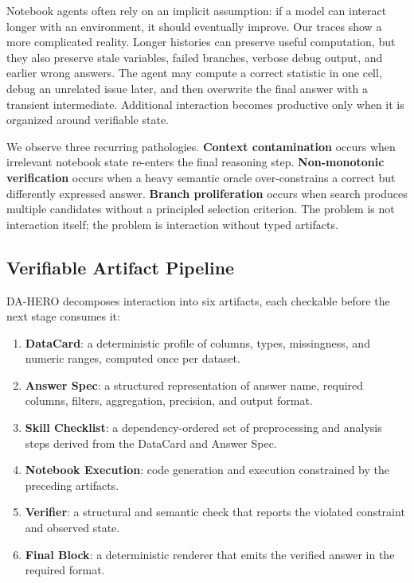 \documentclass[letterpaper]{article} %
\begin{document}
Notebook agents often rely on an implicit assumption: if a model can interact longer with an environment, it should eventually improve.  Our traces show a more complicated reality.  Longer histories can preserve useful computation, but they also preserve stale variables, failed branches, verbose debug output, and earlier wrong answers.  The agent may compute a correct statistic in one cell, debug an unrelated issue later, and then overwrite the final answer with a transient intermediate.  Additional interaction becomes productive only when it is organized around verifiable state.

We observe three recurring pathologies.  \textbf{Context contamination} occurs when irrelevant notebook state re-enters the final reasoning step.  \textbf{Non-monotonic verification} occurs when a heavy semantic oracle over-constrains a correct but differently expressed answer.  \textbf{Branch proliferation} occurs when search produces multiple candidates without a principled selection criterion.  The problem is not interaction itself; the problem is interaction without typed artifacts.

\subsection{Verifiable Artifact Pipeline}

DA-HERO decomposes interaction into six artifacts, each checkable before the next stage consumes it:

\begin{enumerate}
    \item \textbf{DataCard}: a deterministic profile of columns, types, missingness, and numeric ranges, computed once per dataset.
    \item \textbf{Answer Spec}: a structured representation of answer name, required columns, filters, aggregation, precision, and output format.
    \item \textbf{Skill Checklist}: a dependency-ordered set of preprocessing and analysis steps derived from the DataCard and Answer Spec.
    \item \textbf{Notebook Execution}: code generation and execution constrained by the preceding artifacts.
    \item \textbf{Verifier}: a structural and semantic check that reports the violated constraint and observed state.
    \item \textbf{Final Block}: a deterministic renderer that emits the verified answer in the required format.
\end{enumerate}
\end{document}
